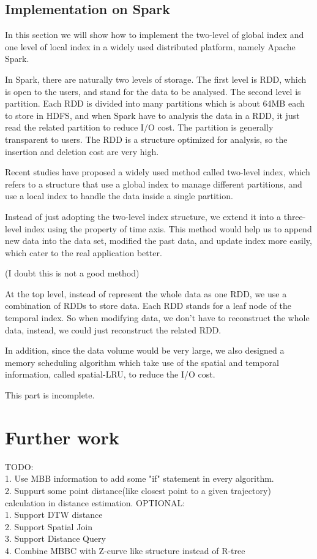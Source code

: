 \documentclass[sigplan]{acmart}
\begin{document}
\subsection{Implementation on Spark}
In this section we will show how to implement the two-level of global index and one level of local index in a widely used distributed platform, namely Apache Spark.\par
In Spark, there are naturally two levels of storage. The first level is RDD, which is open to the users, and stand for the data to be analysed. The second level is partition. Each RDD is divided into many partitions which is about 64MB each to store in HDFS, and when Spark have to analysis the data in a RDD, it just read the related partition to reduce I/O cost. The partition is generally transparent to users. The RDD is a structure optimized for analysis, so the insertion and deletion cost are very high.\par
Recent studies have proposed a widely used method called two-level index, which refers to a structure that use a global index to manage different partitions, and use a local index to handle the data inside a single partition. \par
Instead of just adopting the two-level index structure, we extend it into a three-level index using the property of time axis. This method would help us to append new data into the data set, modified the past data, and update index more easily, which cater to the real application better.\par
(I doubt this is not a good method)\par
At the top level, instead of represent the whole data as one RDD, we use a combination of RDDs to store data. Each RDD stands for a leaf node of the temporal index. So when modifying data, we don't have to reconstruct the whole data, instead, we could just reconstruct the related RDD.\par
In addition, since the data volume would be very large, we also designed a memory scheduling algorithm which take use of the spatial and temporal information, called spatial-LRU, to reduce the I/O cost.\par

This part is incomplete.

\section{Further work}
TODO:\\
1. Use MBB information to add some "if" statement in every algorithm.\\
2. Suppurt some point distance(like closest point to a given trajectory) calculation in distance estimation.
OPTIONAL:\\
1. Support DTW distance\\
2. Support Spatial Join\\
3. Support Distance Query\\
4. Combine MBBC with Z-curve like structure instead of R-tree\par



\end{document}
